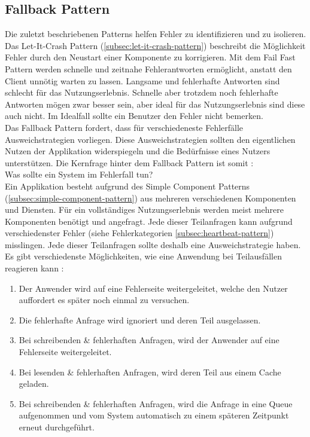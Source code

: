 \subsection{Fallback Pattern}
Die zuletzt beschriebenen Patterns helfen Fehler zu identifizieren und zu isolieren. Das Let-It-Crash Pattern (\ref{subsec:let-it-crash-pattern}) beschreibt die Möglichkeit Fehler durch den Neustart einer Komponente zu korrigieren. Mit dem Fail Fast Pattern werden schnelle und zeitnahe Fehlerantworten ermöglicht, anstatt den Client unnötig warten zu lassen. Langsame und fehlerhafte Antworten sind schlecht für das Nutzungserlebnis. Schnelle aber trotzdem noch fehlerhafte Antworten mögen zwar besser sein, aber ideal für das Nutzungserlebnis sind diese auch nicht. Im Idealfall sollte ein Benutzer den Fehler nicht bemerken.\\
Das Fallback Pattern fordert, dass für verschiedeneste Fehlerfälle Ausweichstrategien vorliegen. Diese Ausweichstrategien sollten den eigentlichen Nutzen der Applikation widerspiegeln und die Bedürfnisse eines Nutzers unterstützen. Die Kernfrage hinter dem Fallback Pattern ist somit \cite{friedrichsen_unkaputtbar_2014}:\\
Was sollte ein System im Fehlerfall tun?\\
Ein Applikation besteht aufgrund des Simple Component Patterns (\ref{subsec:simple-component-pattern}) aus mehreren verschiedenen Komponenten und Diensten. Für ein vollständiges Nutzungserlebnis werden meist mehrere Komponenten benötigt und angefragt. Jede dieser Teilanfragen kann aufgrund verschiedenster Fehler (siehe Fehlerkategorien \ref{subsec:heartbeat-pattern}) misslingen. Jede dieser Teilanfragen sollte deshalb eine Ausweichstrategie haben. Es gibt verschiedenste Möglichkeiten, wie eine Anwendung bei Teilausfällen reagieren kann \cite{friedrichsen_unkaputtbar_2014}:

\begin{enumerate}
\item Der Anwender wird auf eine Fehlerseite weitergeleitet, welche den Nutzer auffordert es später noch einmal zu versuchen.
\item Die fehlerhafte Anfrage wird ignoriert und deren Teil ausgelassen.
\item Bei schreibenden \& fehlerhaften Anfragen, wird der Anwender auf eine Fehlerseite weitergeleitet.
\item Bei lesenden \& fehlerhaften Anfragen, wird deren Teil aus einem Cache geladen.
\item Bei schreibenden \& fehlerhaften Anfragen, wird die Anfrage in eine Queue aufgenommen und vom System automatisch zu einem späteren Zeitpunkt erneut durchgeführt.
\end{enumerate}

